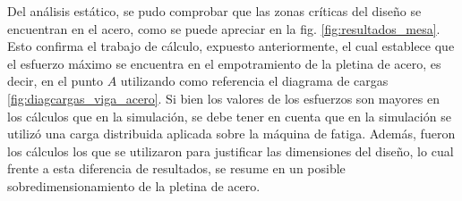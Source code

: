 Del análisis estático, se pudo comprobar que las zonas críticas del diseño se encuentran en el acero, como se puede apreciar en la fig. \ref{fig:resultados_mesa}. Esto confirma el trabajo de cálculo, expuesto anteriormente, el cual establece que el esfuerzo máximo se encuentra en el empotramiento de la pletina de acero, es decir, en el punto $A$ utilizando como referencia el diagrama de cargas \ref{fig:diagcargas_viga_acero}. Si bien los valores de los esfuerzos son mayores en los cálculos que en la simulación, se debe tener en cuenta que en la simulación se utilizó una carga distribuida aplicada sobre la máquina de fatiga. Además, fueron los cálculos los que se utilizaron para justificar las dimensiones del diseño, lo cual frente a esta diferencia de resultados, se resume en un posible sobredimensionamiento de la pletina de acero.

